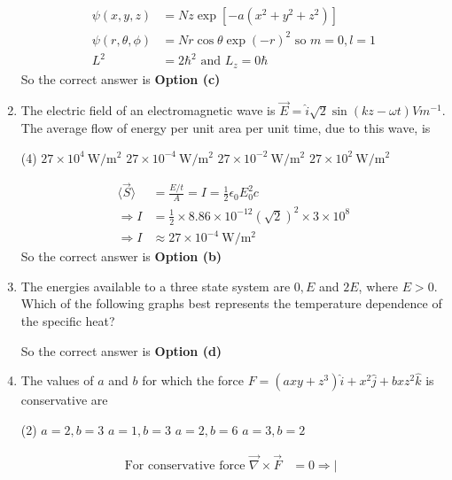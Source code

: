 \begin{enumerate}
\begin{answer}
	\begin{align*}
	\psi(x, y, z)&=N z \exp \left[-a\left(x^{2}+y^{2}+z^{2}\right)\right]\\
	\psi(r, \theta, \phi)&=N r \cos \theta \exp (-r)^{2} \text { so } m=0, l=1\\
	L^{2}&=2 \hbar^{2} \text { and } L_{z}=0 \hbar
	\end{align*}
		So the correct answer is \textbf{Option (c)}
\end{answer}
\item The electric field of an electromagnetic wave is $\vec{E}=\hat{i} \sqrt{2} \sin (k z-\omega t) V m^{-1}$. The average flow of energy per unit area per unit time, due to this wave, is
 \begin{tasks}(4)
	\task[\textbf{a.}]$27 \times 10^{4} \mathrm{~W} / \mathrm{m}^{2}$
	\task[\textbf{b.}]$27 \times 10^{-4} \mathrm{~W} / \mathrm{m}^{2}$
	\task[\textbf{c.}]$27 \times 10^{-2} \mathrm{~W} / \mathrm{m}^{2}$
	\task[\textbf{d.}] $27 \times 10^{2} \mathrm{~W} / \mathrm{m}^{2}$
\end{tasks}
\begin{answer}
	\begin{align*}
	\langle\vec{S}\rangle&=\frac{E / t}{A}=I=\frac{1}{2} \epsilon_{0} E_{0}^{2} c\\
	\Rightarrow I&=\frac{1}{2} \times 8.86 \times 10^{-12}(\sqrt{2})^{2} \times 3 \times 10^{8}\\
	\Rightarrow I &\approx 27 \times 10^{-4} \mathrm{~W} / \mathrm{m}^{2}
	\end{align*}
		So the correct answer is \textbf{Option (b)}
\end{answer}
\item The energies available to a three state system are $0, E$ and $2 E$, where $E>0$. Which of the following graphs best represents the temperature dependence of the specific heat?	
\begin{answer}
	So the correct answer is \textbf{Option (d)}
\end{answer}
\item The values of $a$ and $b$ for which the force $F=\left(a x y+z^{3}\right) \hat{i}+x^{2} \hat{j}+b x z^{2} \hat{k}$ is conservative are
 \begin{tasks}(2)
	\task[\textbf{a.}]$a=2, b=3$
	\task[\textbf{b.}]$a=1, b=3$
	\task[\textbf{c.}]$a=2, b=6$
	\task[\textbf{d.}]$a=3, b=2$
\end{tasks}
\begin{answer}
	\begin{align*}
	\text { For conservative force } \vec{\nabla} \times \vec{F}&=0 \Rightarrow\left|\begin{array}{ccc}

\end{array}
\end{align*}
\end{answer}
\end{enumerate}
